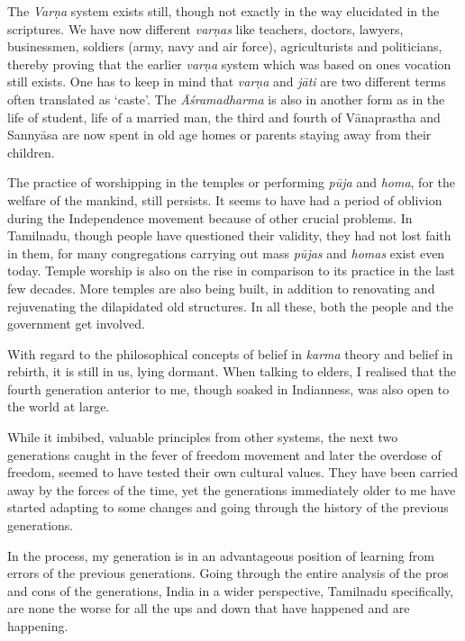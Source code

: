 The \textit{Varṇa} system exists still, though not exactly in the way elucidated in the scriptures. We have now different \textit{varṇas} like teachers, doctors, lawyers, businessmen, soldiers (army, navy and air force), agriculturists and politicians, thereby proving that the earlier \textit{varṇa} system which was based on ones vocation still exists. One has to keep in mind that \textit{varṇa} and \textit{jāti} are two different terms often translated as ‘caste’. The \textit{Āśramadharma} is also in another form as in the life of student, life of a married man, the third and fourth of Vānaprastha and Sannyāsa are now spent in old age homes or parents staying away from their children.

The practice of worshipping in the temples or performing \textit{pūja} and \textit{homa}, for the welfare of the mankind, still persists. It seems to have had a period of oblivion during the Independence movement because of other crucial problems. In Tamilnadu, though people have questioned their validity, they had not lost faith in them, for many congregations carrying out mass \textit{pūjas} and \textit{homas} exist even today. Temple worship is also on the rise in comparison to its practice in the last few decades. More temples are also being built, in addition to renovating and rejuvenating the dilapidated old structures. In all these, both the people and the government get involved.

With regard to the philosophical concepts of belief in \textit{karma} theory and belief in rebirth, it is still in us, lying dormant. When talking to elders, I realised that the fourth generation anterior to me, though soaked in Indianness, was also open to the world at large.

While it imbibed, valuable principles from other systems, the next two generations caught in the fever of freedom movement and later the overdose of freedom, seemed to have tested their own cultural values. They have been carried away by the forces of the time, yet the generations immediately older to me have started adapting to some changes and going through the history of the previous generations.

In the process, my generation is in an advantageous position of learning from errors of the previous generations. Going through the entire analysis of the pros and cons of the generations, India in a wider perspective, Tamilnadu specifically, are none the worse for all the ups and down that have happened and are happening.


